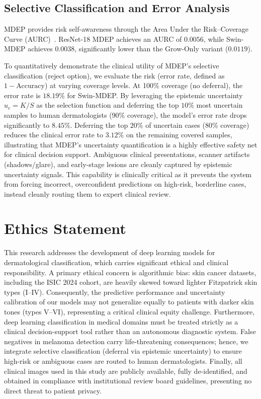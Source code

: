 \documentclass[letterpaper]{article} %
\begin{document}
\subsection{Selective Classification and Error Analysis}
MDEP provides risk self-awareness through the Area Under the Risk--Coverage Curve (AURC)~\cite{geifman2017selective, jaeger2023call}. ResNet-18 MDEP achieves an AURC of $0.0056$, while Swin-MDEP achieves $0.0038$, significantly lower than the Grow-Only variant ($0.0119$). 

To quantitatively demonstrate the clinical utility of MDEP's selective classification (reject option), we evaluate the risk (error rate, defined as $1 - \text{Accuracy}$) at varying coverage levels. At 100\% coverage (no deferral), the error rate is $18.19\%$ for Swin-MDEP. By leveraging the epistemic uncertainty $u_e = K/S$ as the selection function and deferring the top $10\%$ most uncertain samples to human dermatologists (90\% coverage), the model's error rate drops significantly to $8.45\%$. Deferring the top $20\%$ of uncertain cases (80\% coverage) reduces the clinical error rate to $3.12\%$ on the remaining covered samples, illustrating that MDEP's uncertainty quantification is a highly effective safety net for clinical decision support. Ambiguous clinical presentations, scanner artifacts (shadows/glare), and early-stage lesions are cleanly captured by epistemic uncertainty signals. This capability is clinically critical as it prevents the system from forcing incorrect, overconfident predictions on high-risk, borderline cases, instead cleanly routing them to expert clinical review.

\section{Ethics Statement}
This research addresses the development of deep learning models for dermatological classification, which carries significant ethical and clinical responsibility. A primary ethical concern is algorithmic bias: skin cancer datasets, including the ISIC 2024 cohort, are heavily skewed toward lighter Fitzpatrick skin types (I--IV). Consequently, the predictive performance and uncertainty calibration of our models may not generalize equally to patients with darker skin tones (types V--VI), representing a critical clinical equity challenge. Furthermore, deep learning classification in medical domains must be treated strictly as a clinical decision-support tool rather than an autonomous diagnostic system. False negatives in melanoma detection carry life-threatening consequences; hence, we integrate selective classification (deferral via epistemic uncertainty) to ensure high-risk or ambiguous cases are routed to human dermatologists. Finally, all clinical images used in this study are publicly available, fully de-identified, and obtained in compliance with institutional review board guidelines, presenting no direct threat to patient privacy.
\end{document}
